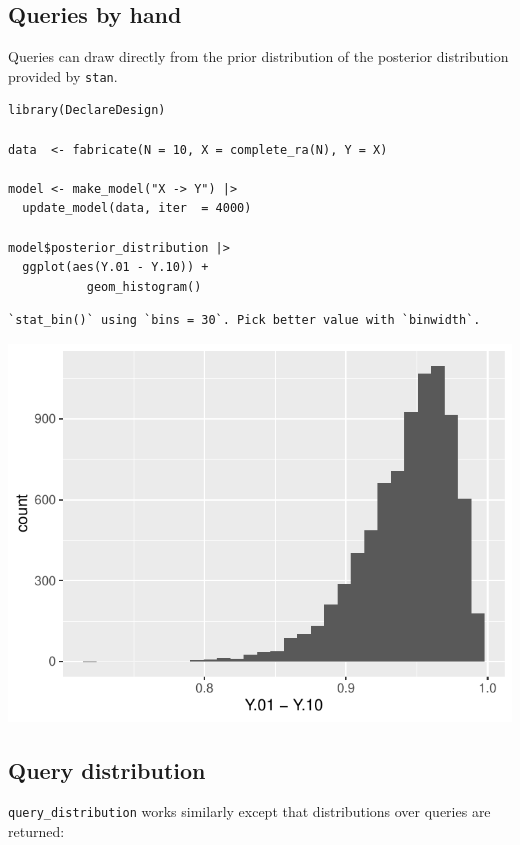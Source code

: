 \documentclass[
  article]{jss}
\begin{document}
\hypertarget{queries-by-hand}{%
\subsection{Queries by hand}\label{queries-by-hand}}

Queries can draw directly from the prior distribution of the posterior
distribution provided by \texttt{stan}.

\begin{verbatim}
library(DeclareDesign)

data  <- fabricate(N = 10, X = complete_ra(N), Y = X)

model <- make_model("X -> Y") |>
  update_model(data, iter  = 4000)

model$posterior_distribution |> 
  ggplot(aes(Y.01 - Y.10)) + 
           geom_histogram()
\end{verbatim}

\begin{verbatim}
`stat_bin()` using `bins = 30`. Pick better value with `binwidth`.
\end{verbatim}

\includegraphics{paper_files/figure-pdf/unnamed-chunk-38-1.pdf}

\hypertarget{query-distribution}{%
\subsection{Query distribution}\label{query-distribution}}

\texttt{query\_distribution} works similarly except that distributions
over queries are returned:
\end{document}
